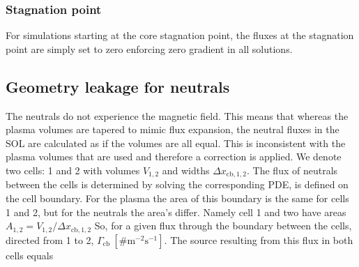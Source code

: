 \documentclass[amsmath,amssymb,a4]{revtex4-2}
\begin{document}
\subsubsection{Stagnation point}
For simulations starting at the core stagnation point, the fluxes at the stagnation point are simply set to zero enforcing zero gradient in all solutions. 

\subsection{Geometry leakage for neutrals}
The neutrals do not experience the magnetic field. This means that whereas the plasma volumes are tapered to mimic flux expansion, the neutral fluxes in the SOL are calculated as if the volumes are all equal. This is inconsistent with the plasma volumes that are used and therefore a correction is applied. We denote two cells: 1 and 2 with volumes $V_{ \mathrm{1,2}}$ and widths $\Delta x_{ \mathrm{cb,1,2}}$. The flux of neutrals between the cells is determined by solving the corresponding PDE, is defined on the cell boundary. For the plasma the area of this boundary is the same for cells 1 and 2, but for the neutrals the area's differ. Namely cell 1 and two have areas $A_{1,2}= V_{ \mathrm{1,2}}/\Delta x_{ \mathrm{cb,1,2}}$ 
So, for a given flux through the boundary between the cells, directed from 1 to 2, $\Gamma_{\mathrm{cb}} ~ \mathrm{[\# m^{-2} s^{-1}]}$. The source resulting from this flux in both cells equals
\end{document}
